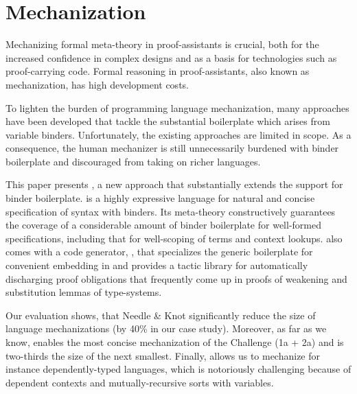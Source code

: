 
\section{Mechanization}
Mechanizing formal meta-theory in proof-assistants is crucial, both for the
increased confidence in complex designs and as a basis for technologies such as
proof-carrying code.  Formal reasoning in proof-assistants, also known as
mechanization, has high development costs.

To lighten the burden of programming language mechanization, many
approaches have been developed that tackle the substantial boilerplate which
arises from variable binders. Unfortunately, the existing approaches are limited
in scope.
As a consequence, the human mechanizer is still unnecessarily burdened with
binder boilerplate and discouraged from taking on richer languages.

This paper presents \Knot, a new approach that substantially extends the support
for binder boilerplate. \Knot is a highly expressive language for natural and
concise specification of syntax with binders. Its meta-theory constructively
guarantees the coverage of a considerable amount of binder boilerplate for
well-formed specifications, including that for well-scoping of terms and context
lookups. \Knot also comes with a code generator, \Needle, that specializes the
generic boilerplate for convenient embedding in \Coq and provides a tactic
library for automatically discharging proof obligations that frequently come up
in proofs of weakening and substitution lemmas of type-systems.

Our evaluation shows, that Needle \& Knot significantly reduce the size of
language mechanizations (by 40\% in our case study). Moreover, as far as we
know, \Knot enables the most concise mechanization of the \POPLmark Challenge
(1a + 2a) and is two-thirds the size of the next smallest. Finally, \Knot allows
us to mechanize for instance dependently-typed languages, which is notoriously
challenging because of dependent contexts and mutually-recursive sorts with
variables.

